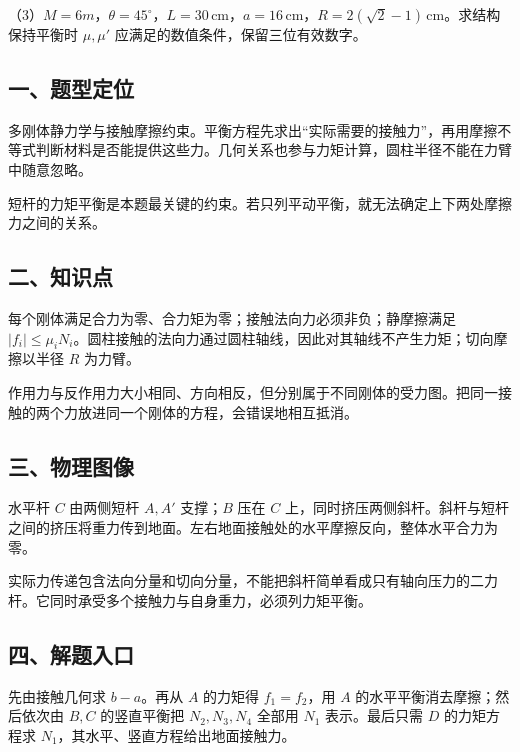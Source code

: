 \documentclass[12pt,a4paper,fontset=fandol]{ctexart}
\begin{document}
（3）\(M=6m\)，\(\theta=45^\circ\)，\(L=30\,\mathrm{cm}\)，\(a=16\,\mathrm{cm}\)，\(R=2(\sqrt2-1)\,\mathrm{cm}\)。求结构保持平衡时
\(\mu,\mu'\) 应满足的数值条件，保留三位有效数字。

\subsection{一、题型定位}\label{ux4e00ux9898ux578bux5b9aux4f4d-3}

多刚体静力学与接触摩擦约束。平衡方程先求出``实际需要的接触力''，再用摩擦不等式判断材料是否能提供这些力。几何关系也参与力矩计算，圆柱半径不能在力臂中随意忽略。

短杆的力矩平衡是本题最关键的约束。若只列平动平衡，就无法确定上下两处摩擦力之间的关系。

\subsection{二、知识点}\label{ux4e8cux77e5ux8bc6ux70b9-3}

每个刚体满足合力为零、合力矩为零；接触法向力必须非负；静摩擦满足
\(|f_i|\le\mu_iN_i\)。圆柱接触的法向力通过圆柱轴线，因此对其轴线不产生力矩；切向摩擦以半径
\(R\) 为力臂。

作用力与反作用力大小相同、方向相反，但分别属于不同刚体的受力图。把同一接触的两个力放进同一个刚体的方程，会错误地相互抵消。

\subsection{三、物理图像}\label{ux4e09ux7269ux7406ux56feux50cf-3}

水平杆 \(C\) 由两侧短杆 \(A,A'\) 支撑；\(B\) 压在 \(C\)
上，同时挤压两侧斜杆。斜杆与短杆之间的挤压将重力传到地面。左右地面接触处的水平摩擦反向，整体水平合力为零。

实际力传递包含法向分量和切向分量，不能把斜杆简单看成只有轴向压力的二力杆。它同时承受多个接触力与自身重力，必须列力矩平衡。

\subsection{四、解题入口}\label{ux56dbux89e3ux9898ux5165ux53e3-3}

先由接触几何求 \(b-a\)。再从 \(A\) 的力矩得 \(f_1=f_2\)，用 \(A\)
的水平平衡消去摩擦；然后依次由 \(B,C\) 的竖直平衡把 \(N_2,N_3,N_4\)
全部用 \(N_1\) 表示。最后只需 \(D\) 的力矩方程求
\(N_1\)，其水平、竖直方程给出地面接触力。
\end{document}
